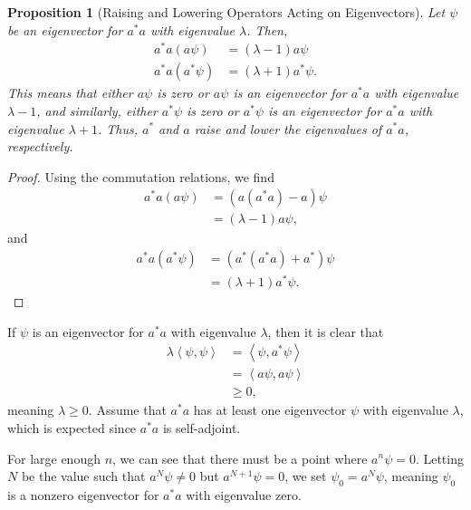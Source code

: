 \documentclass[12pt]{extarticle}
\newcommand{\iprod}[2]{\left\langle #1,#2\right\rangle}
\theoremstyle{plain}
\newtheorem*{proposition}{Proposition}%
\theoremstyle{definition}
\theoremstyle{remark}
\renewcommand{\newline}{\hfill\break}
\begin{document}
  \begin{proposition}[Raising and Lowering Operators Acting on Eigenvectors]
    Let $\psi$ be an eigenvector for $a^{\ast}a$ with eigenvalue $\lambda$. Then,
    \begin{align*}
      a^{\ast}a\left(a\psi\right) &= \left(\lambda - 1\right)a\psi\\
      a^{\ast}a\left(a^{\ast}\psi\right) &= \left(\lambda + 1\right)a^{\ast}\psi.
    \end{align*}
    This means that either $a\psi$ is zero or $a\psi$ is an eigenvector for $a^{\ast}a$ with eigenvalue $\lambda - 1$, and similarly, either $a^{\ast}\psi$ is zero or $a^{\ast}\psi$ is an eigenvector for $a^{\ast}a$ with eigenvalue $\lambda + 1$. Thus, $a^{\ast}$ and $a$ raise and lower the eigenvalues of $a^{\ast}a$, respectively.
  \end{proposition}
  \begin{proof}
    Using the commutation relations, we find
    \begin{align*}
      a^{\ast}a\left(a\psi\right) &= \left(a\left(a^{\ast}a\right)-a\right)\psi\\
                                  &= \left(\lambda - 1\right)a\psi,
    \end{align*}
    and
    \begin{align*}
      a^{\ast}a\left(a^{\ast}\psi\right) &= \left(a^{\ast}\left(a^{\ast}a\right) + a^{\ast}\right)\psi\\
                                         &= \left(\lambda + 1\right)a^{\ast}\psi.
    \end{align*}
  \end{proof}
  If $\psi$ is an eigenvector for $a^{\ast}a$ with eigenvalue $\lambda$, then it is clear that
  \begin{align*}
    \lambda\iprod{\psi}{\psi} &= \iprod{\psi}{a^{\ast}\psi}\\
                              &= \iprod{a\psi}{a\psi}\\
                              &\geq 0,
  \end{align*}
  meaning $\lambda \geq 0$. Assume that $a^{\ast}a$ has at least one eigenvector $\psi$ with eigenvalue $\lambda$, which is expected since $a^{\ast}a$ is self-adjoint.\newline

  For large enough $n$, we can see that there must be a point where $a^{n}\psi = 0$. Letting $N$ be the value such that $a^{N}\psi \neq 0$ but $a^{N+1}\psi = 0$, we set $\psi_0 = a^{N}\psi$, meaning $\psi_0$ is a nonzero eigenvector for $a^{\ast}a$ with eigenvalue zero.\newline
\end{document}
